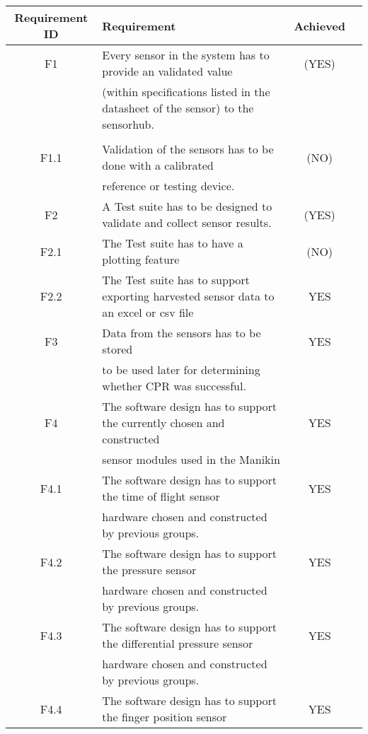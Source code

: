 \begin{table}[hb!]
\begin{tabular}{ |c|l|c|c| } 
 \hline
 Requirement ID & Requirement & Achieved \\ 
 \hline
 \hline
 F1    & Every sensor in the system has to provide an validated value  & (YES) \\ 
       & (within specifications listed in the datasheet of the sensor) to the sensorhub.  &  \\
       &                                                                                  &  \\
\hline
 F1.1  & Validation of the sensors has to be done with a calibrated                       & (NO) \\
       & reference or testing device.                                                     &   \\
\hline
 F2    & A Test suite has to be designed to validate and collect sensor results.          & (YES) \\
 \hline
 F2.1  & The Test suite has to have a plotting feature                                    & (NO) \\
 \hline 
 F2.2  & The Test suite has to support exporting harvested sensor data to an excel or csv file & YES \\
 \hline
 F3    & Data from the sensors has to be stored & YES\\
       & to be used later for determining whether CPR was successful.  & \\
\hline
 F4    & The software design has to support the currently chosen and constructed & YES  \\
       & sensor modules used in the Manikin & \\
 \hline
 F4.1  & The software design has to support the time of flight sensor & YES \\
       & hardware chosen and constructed by previous groups. & \\
\hline
 F4.2  & The software design has to support the pressure sensor & YES \\
       & hardware chosen and constructed by previous groups. & \\
\hline
 F4.3  & The software design has to support the differential pressure sensor & YES \\
       & hardware chosen and constructed by previous groups. & \\
\hline
 F4.4  & The software design has to support the finger position sensor & YES \\

\end{tabular}
\end{table}
